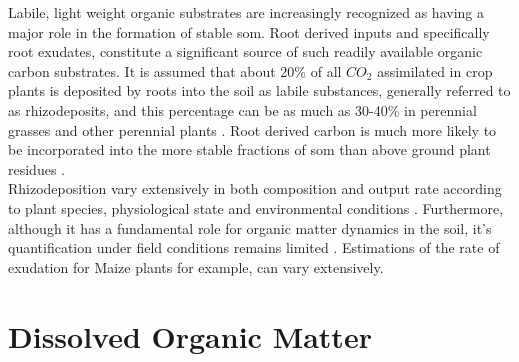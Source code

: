 \documentclass[12pt]{report}
\begin{document}
		Labile, light weight organic substrates are increasingly recognized as having a major role in the formation of stable \gls{som}.
		Root derived inputs and specifically root exudates, constitute a significant source of such readily available organic carbon substrates.  It is assumed that about 20\% of all $ CO_2 $ assimilated in crop plants is deposited by roots into the soil as labile substances, generally referred to as rhizodeposits, and this percentage can be as much as 30-40\% in perennial grasses and other perennial plants \citep{kuzyakov2004, pausch2013, pausch2018}. Root derived carbon is much more likely to be incorporated into the more stable fractions of \gls{som} than above ground plant residues \citep{austin2017, kong2010, puget2001, rasse2005}.\\
		Rhizodeposition vary extensively in both composition and output rate according to plant species, physiological state and environmental conditions \citep{dennis2010, pausch2018, jones2004}. Furthermore, although it has a fundamental role for organic matter dynamics in the soil, it’s quantification under field conditions remains limited \citep{pausch2018}. Estimations of the rate of exudation for Maize plants for example, can vary extensively\citep{nguyen2003, pausch2018}.
		
		\section{Dissolved Organic Matter}
		
\end{document}
